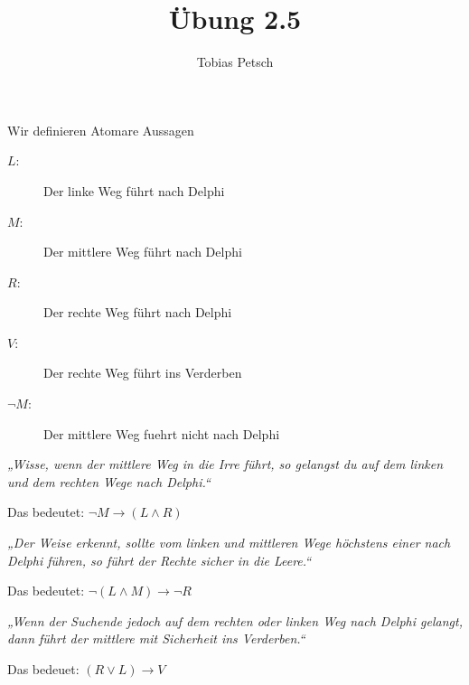 \documentclass[a4paper,12pt]{article}
\title{Übung 2.5}
\author{Tobias Petsch}
\date{}
\begin{document}
\maketitle

Wir definieren Atomare Aussagen \\
\begin{description}
    \item[$L$:] Der linke Weg führt nach Delphi
    \item[$M$:] Der mittlere Weg führt nach Delphi
    \item[$R$:] Der rechte Weg führt nach Delphi
    \item[$V$:] Der rechte Weg führt ins Verderben
    \item[$\neg M$:] Der mittlere Weg fuehrt nicht nach Delphi 
\end{description}

\textit{„Wisse, wenn der mittlere Weg in die Irre führt, so gelangst du auf dem linken und dem rechten Wege nach Delphi.“}

Das bedeutet: $\neg M \rightarrow (L \land R)$

\textit{„Der Weise erkennt, sollte vom linken und mittleren Wege höchstens einer nach Delphi führen, so führt der Rechte sicher in die Leere.“}

Das bedeutet: $\neg (L \land M) \rightarrow \neg R$

\textit{„Wenn der Suchende jedoch auf dem rechten oder linken Weg nach Delphi gelangt, dann führt der mittlere mit Sicherheit ins Verderben.“}

Das bedeuet: $(R \lor L) \rightarrow V$

\end{document}
